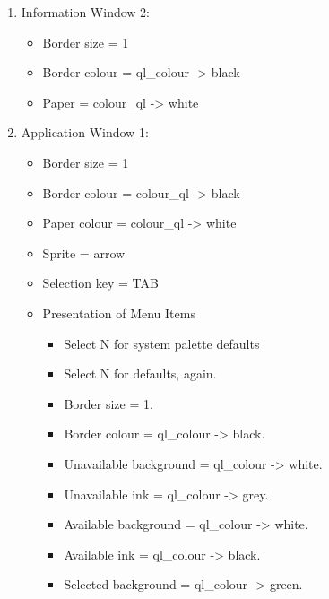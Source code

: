 \begin{enumerate}
{\begin{itemize}[itemsep=0pt]
\end{itemize}
}
\item{Information Window 2:
\begin{itemize}[itemsep=0pt]

\item{}Border size = 1


\item{}Border colour = ql\_colour -{}>{} black


\item{}Paper = colour\_ql -{}>{} white

\end{itemize}
}
\item{Application Window 1:
\begin{itemize}[itemsep=0pt]

\item{}Border size = 1


\item{}Border colour = colour\_ql -{}>{} black


\item{}Paper colour = colour\_ql -{}>{} white


\item{}Sprite = arrow


\item{}Selection key = TAB


\item{}Presentation of Menu Items\begin{itemize}[itemsep=0pt]

\item{}Select N for system palette defaults


\item{}Select N for defaults, again.


\item{}Border size = 1.


\item{}Border colour = ql\_colour -{}>{} black.


\item{}Unavailable background = ql\_colour -{}>{} white.


\item{}Unavailable ink = ql\_colour -{}>{} grey.


\item{}Available background = ql\_colour -{}>{} white.


\item{}Available ink = ql\_colour -{}>{} black.


\item{}Selected background = ql\_colour -{}>{} green.



\end{itemize}
\end{itemize}}
\end{enumerate}

